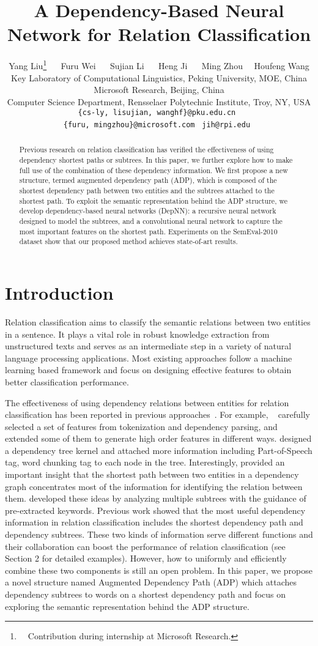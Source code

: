 \documentclass[11pt]{article}
\title{A Dependency-Based Neural Network for Relation Classification}
\author{
Yang Liu\thanks{~~Contribution during internship at Microsoft Research.} ~~ Furu Wei ~~ Sujian Li ~~ Heng Ji ~~ Ming Zhou~~ Houfeng Wang\\
  Key Laboratory of Computational Linguistics, Peking University, MOE, China \\
  Microsoft Research, Beijing, China\\
  Computer Science Department, Rensselaer Polytechnic Institute, Troy, NY, USA\\
  {\tt \{cs-ly, lisujian, wanghf\}@pku.edu.cn } \\
  {\tt \{furu, mingzhou\}@microsoft.com }
  {\tt jih@rpi.edu }
  }
\date{}
\begin{document}
\maketitle
\begin{abstract}
Previous research on relation classification has verified the effectiveness of using dependency shortest paths or subtrees.
In this paper, we further explore how to make full use of the combination of these dependency information.
We first propose a new structure, termed augmented dependency path (ADP), which is composed of the shortest dependency path  between two entities  and the subtrees attached to the shortest path.
To exploit the semantic representation behind the ADP structure, we develop   dependency-based neural networks (DepNN): a recursive neural network  designed to model the subtrees, and a convolutional neural network to capture the most important features on the shortest path.
Experiments on the SemEval-2010 dataset show that our proposed method achieves  state-of-art results.


\end{abstract}

\section{Introduction}
Relation classification aims to classify the semantic relations between two entities in a sentence. It plays a vital role in robust knowledge extraction from unstructured texts and serves as an intermediate step in a variety of natural language processing
applications. Most existing approaches  follow a machine learning based framework and focus on
designing effective features to obtain better classification performance.

The effectiveness of using dependency relations between entities for relation classification has been reported in previous approaches~\cite{bach2007survey}.
For example, ~ carefully selected a set of features from tokenization and dependency parsing, and extended some of them to generate high order features in different ways.
 designed a dependency tree kernel and attached more information including Part-of-Speech tag, word chunking tag to each node in the tree. Interestingly,  provided an important insight that the shortest path between  two entities in a dependency graph concentrates most of the information for identifying the relation between them.
 developed these ideas by analyzing multiple subtrees with the guidance of pre-extracted keywords.
 Previous work showed that the most useful dependency information in relation classification includes the shortest dependency path and dependency subtrees. These two kinds of information serve different functions and their collaboration can boost the performance of relation classification  (see Section 2 for detailed examples).
However, how to uniformly and efficiently  combine these two components is still an open problem.
In this paper, we propose a novel structure named Augmented Dependency Path (ADP) which attaches dependency subtrees to words on a shortest dependency path and focus on exploring the semantic representation behind the ADP structure.
\end{document}
